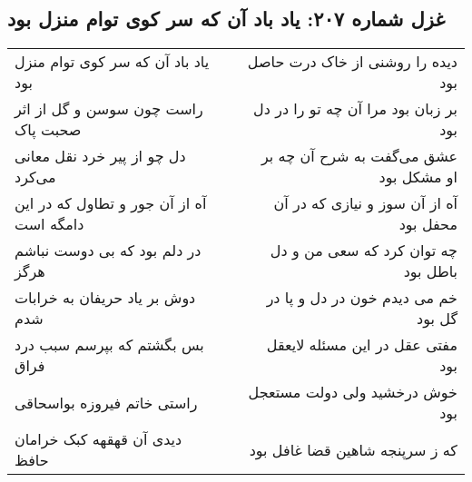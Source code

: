 \begin{center}
\section*{غزل شماره ۲۰۷: یاد باد آن که سر کوی توام منزل بود}
\label{sec:sh207}
\begin{longtable}{l p{0.5cm} r}
یاد باد آن که سر کوی توام منزل بود
&&
دیده را روشنی از خاک درت حاصل بود
\\
راست چون سوسن و گل از اثر صحبت پاک
&&
بر زبان بود مرا آن چه تو را در دل بود
\\
دل چو از پیر خرد نقل معانی می‌کرد
&&
عشق می‌گفت به شرح آن چه بر او مشکل بود
\\
آه از آن جور و تطاول که در این دامگه است
&&
آه از آن سوز و نیازی که در آن محفل بود
\\
در دلم بود که بی دوست نباشم هرگز
&&
چه توان کرد که سعی من و دل باطل بود
\\
دوش بر یاد حریفان به خرابات شدم
&&
خم می دیدم خون در دل و پا در گل بود
\\
بس بگشتم که بپرسم سبب درد فراق
&&
مفتی عقل در این مسئله لایعقل بود
\\
راستی خاتم فیروزه بواسحاقی
&&
خوش درخشید ولی دولت مستعجل بود
\\
دیدی آن قهقهه کبک خرامان حافظ
&&
که ز سرپنجه شاهین قضا غافل بود
\\
\end{longtable}
\end{center}
